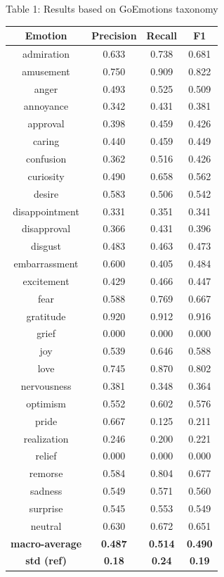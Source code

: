 \documentclass{article}
\begin{document}
\begin{minipage}[c]{0.55\textwidth}
\centering
{Table 1: Results based on GoEmotions taxonomy}
\begin{tabular}{c c c c}
\hline\hline
Emotion & Precision & Recall & F1 \\ [0.5ex]
\hline 
admiration & 0.633 & 0.738 & 0.681\\
amusement & 0.750 & 0.909 & 0.822\\
anger & 0.493 & 0.525 & 0.509\\
annoyance & 0.342 & 0.431 & 0.381\\
approval & 0.398 & 0.459 & 0.426\\
caring & 0.440 & 0.459 & 0.449\\
confusion & 0.362 & 0.516 & 0.426\\
curiosity & 0.490 & 0.658 & 0.562\\
desire & 0.583 & 0.506 & 0.542\\
disappointment & 0.331 & 0.351 & 0.341\\
disapproval & 0.366 & 0.431 & 0.396\\
disgust & 0.483 & 0.463 & 0.473\\
embarrassment & 0.600 & 0.405 & 0.484\\
excitement & 0.429 & 0.466 & 0.447\\
fear & 0.588 & 0.769 & 0.667\\
gratitude & 0.920 & 0.912 & 0.916\\
grief & 0.000 & 0.000 & 0.000\\
joy & 0.539 & 0.646 & 0.588\\
love & 0.745 & 0.870 & 0.802\\
nervousness & 0.381 & 0.348 & 0.364\\
optimism & 0.552 & 0.602 & 0.576\\
pride & 0.667 & 0.125 & 0.211\\
realization & 0.246 & 0.200 & 0.221\\
relief & 0.000 & 0.000 & 0.000\\
remorse & 0.584 & 0.804 & 0.677\\
sadness & 0.549 & 0.571 & 0.560\\
surprise & 0.545 & 0.553 & 0.549\\
neutral & 0.630 & 0.672 & 0.651\\
\textbf{macro-average} & \textbf{ 0.487 } & \textbf{ 0.514 } & \textbf{ 0.490 }\\
\textbf{std (ref)} & \textbf{0.18} & \textbf{ 0.24} & \textbf{ 0.19 }\\[1ex] 
\hline 
\end{tabular}



\end{minipage}
\end{document}
